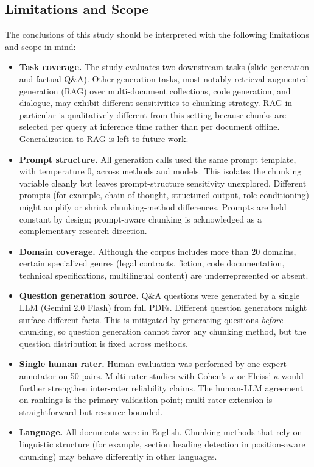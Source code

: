 \documentclass{ieeeaccess}
\begin{document}
\subsection{Limitations and Scope}

The conclusions of this study should be interpreted with the following limitations and scope in mind:

\begin{itemize}
    \item \textbf{Task coverage.} The study evaluates two downstream tasks (slide generation and factual Q\&A). Other generation tasks, most notably retrieval-augmented generation (RAG) over multi-document collections, code generation, and dialogue, may exhibit different sensitivities to chunking strategy. RAG in particular is qualitatively different from this setting because chunks are selected per query at inference time rather than per document offline. Generalization to RAG is left to future work.
    \item \textbf{Prompt structure.} All generation calls used the same prompt template, with temperature 0, across methods and models. This isolates the chunking variable cleanly but leaves prompt-structure sensitivity unexplored. Different prompts (for example, chain-of-thought, structured output, role-conditioning) might amplify or shrink chunking-method differences. Prompts are held constant by design; prompt-aware chunking is acknowledged as a complementary research direction.
    \item \textbf{Domain coverage.} Although the corpus includes more than 20 domains, certain specialized genres (legal contracts, fiction, code documentation, technical specifications, multilingual content) are underrepresented or absent.
    \item \textbf{Question generation source.} Q\&A questions were generated by a single LLM (Gemini 2.0 Flash) from full PDFs. Different question generators might surface different facts. This is mitigated by generating questions \emph{before} chunking, so question generation cannot favor any chunking method, but the question distribution is fixed across methods.
    \item \textbf{Single human rater.} Human evaluation was performed by one expert annotator on 50 pairs. Multi-rater studies with Cohen's $\kappa$ or Fleiss' $\kappa$ would further strengthen inter-rater reliability claims. The human-LLM agreement on rankings is the primary validation point; multi-rater extension is straightforward but resource-bounded.
    \item \textbf{Language.} All documents were in English. Chunking methods that rely on linguistic structure (for example, section heading detection in position-aware chunking) may behave differently in other languages.

\end{itemize}
\end{document}
